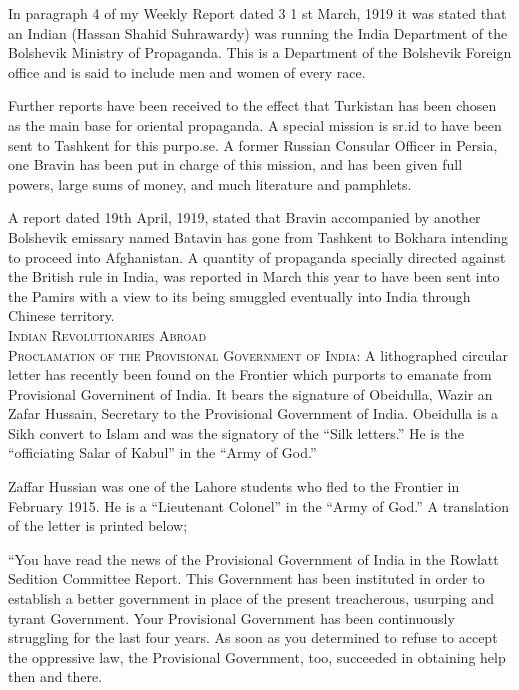 In paragraph 4 of my Weekly Report dated 3 1 st March, 1919 it was stated that an Indian (Hassan Shahid Suhrawardy) was running the India Department of the Bolshevik Ministry of Propaganda. This is a Department of the Bolshevik Foreign office and is said to include men and women of every race. 

Further reports have been received to the effect that Turkistan has been chosen as the main base for oriental propaganda. A special mission is sr.id to have been sent to Tashkent for this purpo.se. A former Russian Consular Officer in Persia, one Bravin has been put in charge of this mission, and has been given full powers, large sums of money, and much literature and pamphlets. 

A report dated 19th April, 1919, stated that Bravin accompanied by another Bolshevik emissary named Batavin has gone from Tashkent to Bokhara intending to proceed into Afghanistan. A quantity of propaganda specially directed against the British rule in India, was reported in March this year to have been sent into the Pamirs with a view to its being smuggled eventually into India through Chinese territory. \\

\textsc{Indian Revolutionaries Abroad} \\

\textsc{Proclamation of the Provisional Government of India:} A lithographed circular letter has recently been found on the Frontier which purports to emanate from Provisional Governinent of India. It bears the signature of Obeidulla, Wazir an Zafar Hussain, Secretary to the Provisional Government of India. Obeidulla is a Sikh convert to Islam and was the signatory of the “Silk letters.” He is the “officiating Salar of Kabul” in the “Army of God.” 

Zaffar Hussian was one of the Lahore students who fled to the Frontier in February 1915. He is a “Lieutenant Colonel” in the “Army of God.” A translation of the letter is printed below; 

“You have read the news of the Provisional Government of India in the Rowlatt Sedition Committee Report. This Government has been instituted in order to establish a better government in place of the present treacherous, usurping and tyrant Government. Your Provisional Government has been continuously struggling for the last four years. As soon as you determined to refuse to accept the oppressive law, the Provisional Government, too, succeeded in obtaining help then and there. 

